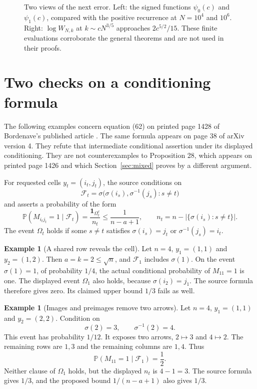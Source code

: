 \documentclass[11pt]{article}
\theoremstyle{definition}
\newtheorem{example}[theorem]{Example}
\theoremstyle{remark}
\newcommand{\PP}{\mathbb P}
\newcommand{\1}{\mathbf 1}
\begin{document}
\begin{figure}[htbp]
\caption{Two views of the next error. Left: the signed functions $\psi_0(c)$ and $\psi_1(c)$, compared with the positive recurrence at $N=10^4$ and $10^6$. Right: $\log W_{N,k}$ at $k\sim cN^{3/5}$ approaches $2c^{5/2}/15$. These finite evaluations corroborate the general theorems and are not used in their proofs.}
\label{fig:ratehierarchy}
\end{figure}


\clearpage
\section{Two checks on a conditioning formula}\label{sec:conditioning}

The following examples concern equation (62) on printed page 1428 of Bordenave's published article \cite{Bordenave}. The same formula appears on page 38 of arXiv version 4. They refute that intermediate conditional assertion under its displayed conditioning. They are not counterexamples to Proposition 28, which appears on printed page 1426 and which Section~\ref{sec:mixed} proves by a different argument.

For requested cells $y_t=(i_t,j_t)$, the source conditions on
\[
\mathcal F_t=\sigma\bigl(\sigma(i_s),\sigma^{-1}(j_s):s\ne t\bigr)
\]
and asserts a probability of the form
\[
\PP(M_{i_tj_t}=1\mid\mathcal F_t)
=\frac{\1_{\Omega_t^c}}{n_t}\le\frac1{n-a+1},
\qquad
n_t=n-|\{\sigma(i_s):s\ne t\}|.
\]
The event $\Omega_t$ holds if some $s\ne t$ satisfies $\sigma(i_s)=j_t$ or $\sigma^{-1}(j_s)=i_t$.

\begin{example}[A shared row reveals the cell]
Let $n=4$, $y_1=(1,1)$ and $y_2=(1,2)$. Then $a=k=2\le\sqrt n$, and $\mathcal F_1$ includes $\sigma(1)$. On the event $\sigma(1)=1$, of probability $1/4$, the actual conditional probability of $M_{11}=1$ is one. The displayed event $\Omega_1$ also holds, because $\sigma(i_2)=j_1$. The source formula therefore gives zero. Its claimed upper bound $1/3$ fails as well.
\end{example}

\begin{example}[Images and preimages remove two arrows]
Let $n=4$, $y_1=(1,1)$ and $y_2=(2,2)$. Condition on
\[
\sigma(2)=3,\qquad \sigma^{-1}(2)=4.
\]
This event has probability $1/12$. It exposes two arrows, $2\mapsto3$ and $4\mapsto2$. The remaining rows are $1,3$ and the remaining columns are $1,4$. Thus
\[
\PP(M_{11}=1\mid\mathcal F_1)=\frac12.
\]
Neither clause of $\Omega_1$ holds, but the displayed $n_t$ is $4-1=3$. The source formula gives $1/3$, and the proposed bound $1/(n-a+1)$ also gives $1/3$.
\end{example}
\end{document}
